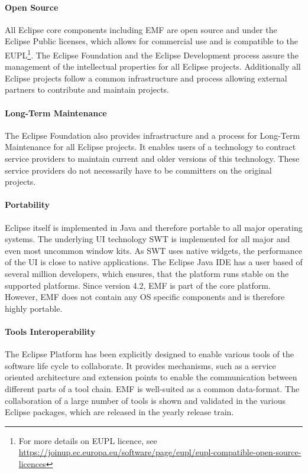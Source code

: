 \paragraph {Open Source}
All Eclipse core components including EMF are open source and under
the Eclipse Public licenses, which allows for commercial use and is
compatible to the EUPL\footnote{For more details on EUPL licence, see \url{https://joinup.ec.europa.eu/software/page/eupl/eupl-compatible-open-source-licences}}. The Eclipse Foundation and the Eclipse
Development process assure the management of the intellectual
properties for all Eclipse projects. Additionally all Eclipse projects
follow a common infrastructure and process allowing external partners
to contribute and maintain projects. 

\paragraph{Long-Term Maintenance}
The Eclipse Foundation also provides infrastructure and a process for
Long-Term Maintenance for all Eclipse projects. It enables users of a
technology to contract service providers to maintain current and older
versions of this technology. These service providers do not
necessarily have to be committers on the original projects.

\paragraph{Portability}
Eclipse itself is implemented in Java and therefore portable to all
major operating systems. The underlying UI technology SWT is
implemented for all major and even most uncommon window kits. As SWT
uses native widgets, the performance of the UI is close to native
applications. The Eclipse Java IDE has a user based of several million
developers, which ensures, that the platform runs stable on the
supported platforms. Since version 4.2, EMF is part of the core
platform. However, EMF does not contain any OS specific components and
is therefore highly portable.

\paragraph{Tools Interoperability}
The Eclipse Platform has been explicitly designed to enable various
tools of the software life cycle to collaborate. It provides
mechanisms, such as a service oriented architecture and extension
points to enable the communication between different parts of a tool
chain. EMF is well-suited as a common data-format. The collaboration
of a large number of tools is shown and validated in the various
Eclipse packages, which are released in the yearly release train.


